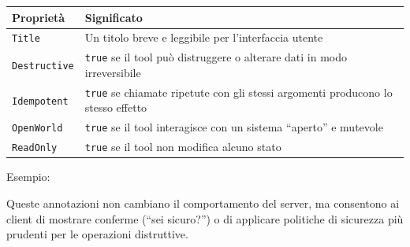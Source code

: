 \documentclass[
  italian,
  10pt,
]{book}
\newenvironment{Shaded}{\begin{snugshade}}{\end{snugshade}}
\newcommand{\DataTypeTok}[1]{\textcolor[rgb]{0.13,0.29,0.53}{#1}}
\newcommand{\FunctionTok}[1]{\textcolor[rgb]{0.13,0.29,0.53}{\textbf{#1}}}
\newcommand{\KeywordTok}[1]{\textcolor[rgb]{0.13,0.29,0.53}{\textbf{#1}}}
\newcommand{\NormalTok}[1]{#1}
\newcommand{\OperatorTok}[1]{\textcolor[rgb]{0.81,0.36,0.00}{\textbf{#1}}}
\newcommand{\StringTok}[1]{\textcolor[rgb]{0.31,0.60,0.02}{#1}}
\newcounter{none} %
\begin{document}
{\def\LTcaptype{none} %
\begin{longtable}[]{@{}
  >{\raggedright\arraybackslash}p{}
  >{\raggedright\arraybackslash}p{}@{}}
\toprule\noalign{}
\begin{minipage}[b]{\linewidth}\raggedright
Proprietà
\end{minipage} & \begin{minipage}[b]{\linewidth}\raggedright
Significato
\end{minipage} \\
\midrule\noalign{}
\endhead
\bottomrule\noalign{}
\endlastfoot
\texttt{Title} & Un titolo breve e leggibile per l'interfaccia utente \\
\texttt{Destructive} & \texttt{true} se il tool può distruggere o
alterare dati in modo irreversibile \\
\texttt{Idempotent} & \texttt{true} se chiamate ripetute con gli stessi
argomenti producono lo stesso effetto \\
\texttt{OpenWorld} & \texttt{true} se il tool interagisce con un sistema
``aperto'' e mutevole \\
\texttt{ReadOnly} & \texttt{true} se il tool non modifica alcuno
stato \\
\end{longtable}
}

Esempio:

\begin{Shaded}
\end{Shaded}

Queste annotazioni non cambiano il comportamento del server, ma
consentono ai client di mostrare conferme (``sei sicuro?'') o di
applicare politiche di sicurezza più prudenti per le operazioni
distruttive.
\end{document}
